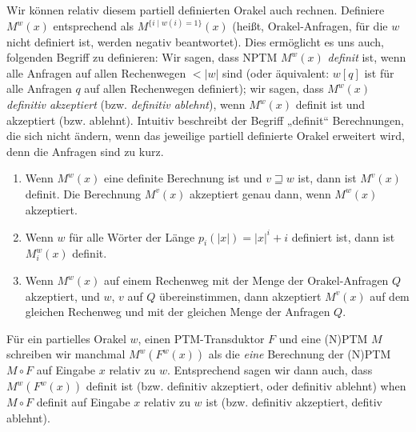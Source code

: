 Wir können relativ diesem partiell definierten Orakel auch rechnen. Definiere $M^w(x)$ entsprechend als $M^{\{i\mid w(i)=1\}}(x)$ (heißt, Orakel-Anfragen, für die $w$ nicht definiert ist, werden negativ beantwortet).
Dies ermöglicht es uns auch, folgenden Begriff zu definieren: Wir sagen, dass NPTM $M^w(x)$ \emph{definit} ist, wenn alle Anfragen auf allen Rechenwegen $<|w|$ sind (oder äquivalent: $w[q]$ ist für alle Anfragen $q$ auf allen Rechenwegen definiert); wir sagen, dass $M^w(x)$ \emph{definitiv akzeptiert} (bzw. \emph{definitiv ablehnt}), wenn $M^w(x)$ definit ist und akzeptiert (bzw. ablehnt). Intuitiv beschreibt der Begriff „definit“ Berechnungen, die sich nicht ändern, wenn das jeweilige partiell definierte Orakel erweitert wird, denn die Anfragen sind zu kurz.
\begin{observation}\label{obs:partialoracles}
    \begin{enumerate}
        \item Wenn $M^w(x)$ eine definite Berechnung ist und $v\sqsupseteq w$ ist, dann ist $M^v(x)$ definit. Die Berechnung $M^v(x)$ akzeptiert genau dann, wenn $M^w(x)$ akzeptiert.
        \item Wenn $w$ für alle Wörter der Länge $p_i(|x|)=|x|^i+i$ definiert ist, dann ist $M_i^w(x)$ definit.
        \item Wenn $M^w(x)$ auf einem Rechenweg mit der Menge der Orakel-Anfragen $Q$ akzeptiert, und $w$, $v$ auf $Q$ übereinstimmen, dann akzeptiert $M^v(x)$ auf dem gleichen Rechenweg und mit der gleichen Menge der Anfragen $Q$.
    \end{enumerate}
\end{observation}

Für ein partielles Orakel $w$, einen PTM-Transduktor $F$ und eine (N)PTM $M$ schreiben wir manchmal $M^w(F^w(x))$ als die \emph{eine} Berechnung der (N)PTM $M\circ F$ auf Eingabe $x$ relativ zu $w$.
Entsprechend sagen wir dann auch, dass $M^w(F^w(x))$ definit ist (bzw. definitiv akzeptiert, oder definitiv ablehnt) when $M\circ F$ definit auf Eingabe $x$ relativ zu $w$ ist (bzw. definitiv akzeptiert, defitiv ablehnt).

